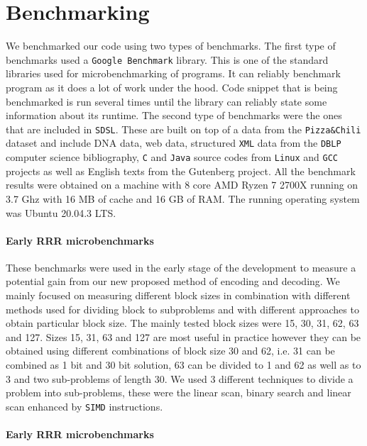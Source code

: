 \section{Benchmarking}

We benchmarked our code using two types of benchmarks. The first type of benchmarks used
a \texttt{Google Benchmark} library. This is one of the standard libraries used for
microbenchmarking of programs. It can reliably benchmark program as it does a lot of work
under the hood. Code snippet that is being benchmarked is run several times until the
library can reliably state some information about its runtime. The second type of benchmarks
were the ones that are included in \texttt{SDSL}. These are built on top of a data from the
\texttt{Pizza\&Chili} dataset \citep{ferragina2005pizza} and include DNA data, web data, structured
\texttt{XML} data from the \texttt{DBLP} computer science bibliography, \texttt{C} and
\texttt{Java} source codes from \texttt{Linux} and \texttt{GCC} projects as well as English
texts from the Gutenberg project. All the benchmark results were obtained on a machine
with 8 core AMD Ryzen 7 2700X running on 3.7 Ghz with 16 MB of cache and 16 GB of RAM. The
running operating system was Ubuntu 20.04.3 LTS.

\paragraph{Early RRR microbenchmarks}

These benchmarks were used in the early stage of the development to measure a potential gain from
our new proposed method of encoding and decoding. We mainly focused on measuring different block sizes
in combination with different methods used for dividing block to subproblems and with different
approaches to obtain particular block size. The mainly tested block sizes were 15, 30, 31, 62, 63
and 127. Sizes 15, 31, 63 and 127 are most useful in practice however they can be obtained using
different combinations of block size 30 and 62, i.e. 31 can be combined as 1 bit and 30 bit solution,
63 can be divided to 1 and 62 as well as to 3 and two sub-problems of length 30.
We used 3 different techniques to divide a problem into sub-problems, these were the linear scan,
binary search and linear scan enhanced by \texttt{SIMD} instructions.

\paragraph{Early RRR microbenchmarks}


